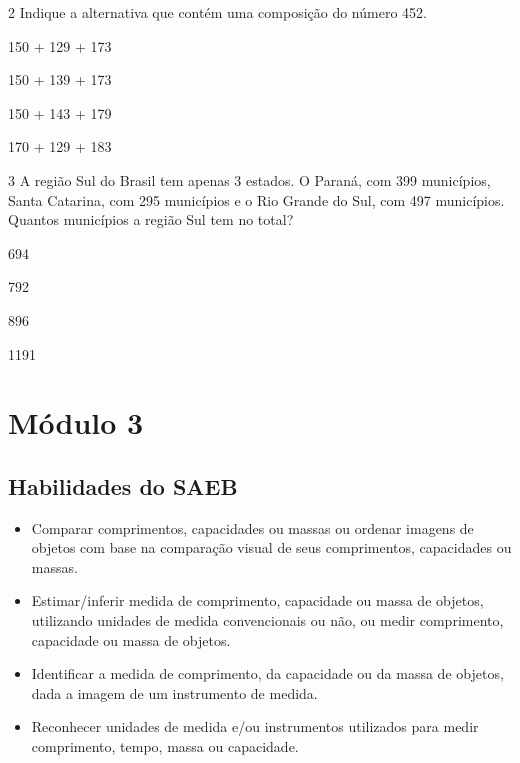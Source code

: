 \num{2} Indique a alternativa que contém uma composição do número 452.

\begin{escolha}[itemsep=-5pt]
\item 150 + 129 + 173

\item 150 + 139 + 173

\item 150 + 143 + 179

\item 170 + 129 + 183
\end{escolha}


\num{3} A região Sul do Brasil tem apenas 3 estados. O Paraná, com 399
municípios, Santa Catarina, com 295 municípios e o Rio Grande do Sul, com
497 municípios. Quantos municípios a região Sul tem no total?

\begin{escolha}[itemsep=-5pt]
\item 694

\item 792

\item 896

\item 1191
\end{escolha}

\chapter{Módulo 3}


\vspace*{-1cm}

\section*{Habilidades do SAEB}

\begin{itemize}
\item Comparar comprimentos, capacidades ou massas ou ordenar imagens de
  objetos com base na comparação visual de seus comprimentos, capacidades ou massas.

\item Estimar/inferir medida de comprimento, capacidade ou massa de objetos,
  utilizando unidades de medida convencionais ou não, ou medir
  comprimento, capacidade ou massa de objetos.

\item Identificar a medida de comprimento, da capacidade ou da massa de
  objetos, dada a imagem de um instrumento de medida.

\item Reconhecer unidades de medida e/ou instrumentos utilizados para medir
  comprimento, tempo, massa ou capacidade.
\end{itemize}

